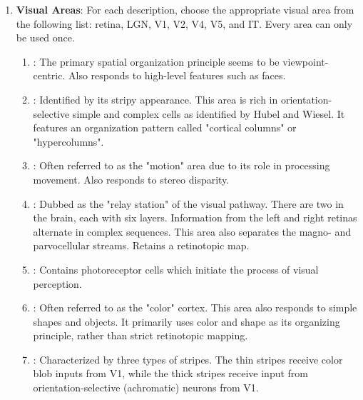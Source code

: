 \documentclass[11pt,letterpaper]{article}
\begin{document}
\begin{enumerate}
    \item \textbf{Visual Areas}: For each description, choose the appropriate visual area from the following list: retina, LGN, V1, V2, V4, V5, and IT. Every area can only be used once.
    \begin{enumerate}
        \item \underline{\hspace{2 cm}}: The primary spatial organization principle seems to be viewpoint-centric. Also responds to high-level features such as faces.
        \item \underline{\hspace{2 cm}}: Identified by its stripy appearance. This area is rich in orientation-selective simple and complex cells as identified by Hubel and Wiesel. It features an organization pattern called "cortical columns" or "hypercolumns".
        \item \underline{\hspace{2 cm}}: Often referred to as the "motion" area due to its role in processing movement. Also responds to stereo disparity.
        \item \underline{\hspace{2 cm}}: Dubbed as the "relay station" of the visual pathway. There are two in the brain, each with six layers. Information from the left and right retinas alternate in complex sequences. This area also separates the magno- and parvocellular streams. Retains a retinotopic map.
        \item \underline{\hspace{2 cm}}: Contains photoreceptor cells which initiate the process of visual perception.
        \item \underline{\hspace{2 cm}}: Often referred to as the "color" cortex. This area also responds to simple shapes and objects. It primarily uses color and shape as its organizing principle, rather than strict retinotopic mapping.
        \item \underline{\hspace{2 cm}}: Characterized by three types of stripes. The thin stripes receive color blob inputs from V1, while the thick stripes receive input from orientation-selective (achromatic) neurons from V1.
    \end{enumerate}



\vspace{1 cm}


    

    
    
\end{enumerate}
\end{document}
